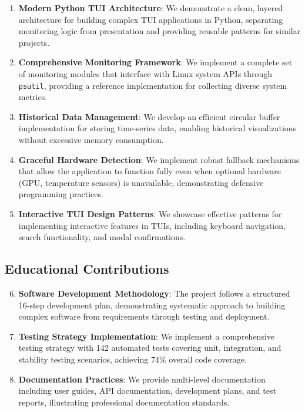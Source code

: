 \documentclass[12pt,a4paper,oneside]{report}
\begin{document}
\begin{enumerate}
    \item \textbf{Modern Python TUI Architecture}: We demonstrate a clean, layered architecture for building complex TUI applications in Python, separating monitoring logic from presentation and providing reusable patterns for similar projects.
    
    \item \textbf{Comprehensive Monitoring Framework}: We implement a complete set of monitoring modules that interface with Linux system APIs through \texttt{psutil}, providing a reference implementation for collecting diverse system metrics.
    
    \item \textbf{Historical Data Management}: We develop an efficient circular buffer implementation for storing time-series data, enabling historical visualizations without excessive memory consumption.
    
    \item \textbf{Graceful Hardware Detection}: We implement robust fallback mechanisms that allow the application to function fully even when optional hardware (GPU, temperature sensors) is unavailable, demonstrating defensive programming practices.
    
    \item \textbf{Interactive TUI Design Patterns}: We showcase effective patterns for implementing interactive features in TUIs, including keyboard navigation, search functionality, and modal confirmations.
\end{enumerate}

\subsection{Educational Contributions}

\begin{enumerate}
    \setcounter{enumi}{5}
    \item \textbf{Software Development Methodology}: The project follows a structured 16-step development plan, demonstrating systematic approach to building complex software from requirements through testing and deployment.
    
    \item \textbf{Testing Strategy Implementation}: We implement a comprehensive testing strategy with 142 automated tests covering unit, integration, and stability testing scenarios, achieving 74\% overall code coverage.
    
    \item \textbf{Documentation Practices}: We provide multi-level documentation including user guides, API documentation, development plans, and test reports, illustrating professional documentation standards.
\end{enumerate}
\end{document}

